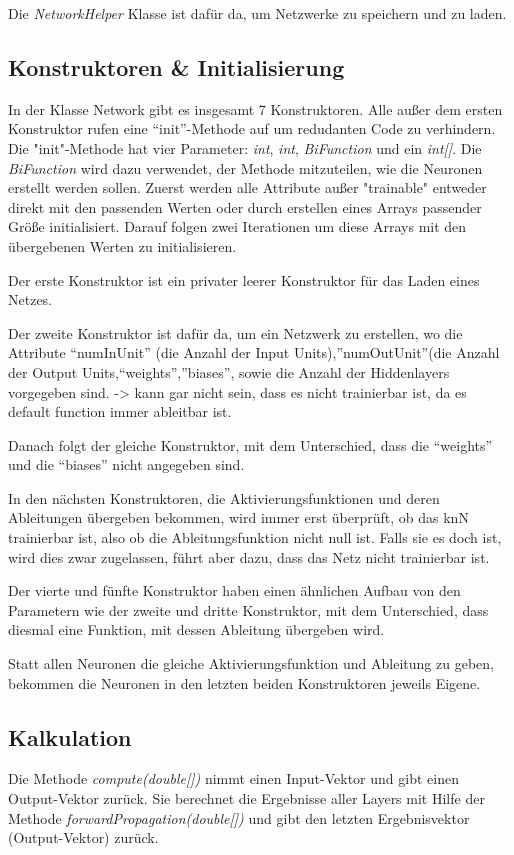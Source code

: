 \documentclass[paper=A4,pagesize=auto,12pt,headinclude=true,footinclude=true,BCOR=0mm,DIV=calc]{scrartcl}
\begin{document}
Die \textit{NetworkHelper} Klasse ist dafür da, um Netzwerke zu speichern und zu laden.


\subsection{Konstruktoren \& Initialisierung}
In der Klasse Network gibt es insgesamt 7 Konstruktoren.
Alle außer dem ersten Konstruktor rufen eine “init”-Methode auf um redudanten Code zu verhindern. Die "init"-Methode hat vier Parameter: \textit{int}, \textit{int}, \textit{BiFunction} und ein \textit{int[]}. Die \textit{BiFunction} wird dazu verwendet, der Methode mitzuteilen, wie die Neuronen erstellt werden sollen.
Zuerst werden alle Attribute außer "trainable" entweder direkt mit den passenden Werten oder durch erstellen eines Arrays passender Größe initialisiert.
Darauf folgen zwei Iterationen um diese Arrays mit den übergebenen Werten zu initialisieren.

Der erste Konstruktor ist ein privater leerer Konstruktor für das Laden eines Netzes. 

Der zweite Konstruktor ist dafür da, um ein Netzwerk zu erstellen, wo die Attribute “numInUnit” (die Anzahl der Input Units),”numOutUnit”(die Anzahl der Output Units,“weights”,”biases”, sowie die Anzahl der Hiddenlayers vorgegeben sind.
-> kann gar nicht sein, dass es nicht trainierbar ist, da es default function immer ableitbar ist.

Danach folgt der gleiche Konstruktor, mit dem Unterschied, dass die “weights” und die “biases” nicht angegeben sind.

In den nächsten Konstruktoren, die Aktivierungsfunktionen und deren Ableitungen übergeben bekommen, wird immer erst überprüft, ob das knN trainierbar ist, also ob die Ableitungsfunktion nicht null ist. Falls sie es doch ist, wird dies zwar zugelassen, führt aber dazu, dass das Netz nicht trainierbar ist. 

Der vierte und fünfte Konstruktor haben einen ähnlichen Aufbau von den Parametern wie der zweite und dritte Konstruktor, mit dem Unterschied, dass diesmal eine Funktion, mit dessen Ableitung übergeben wird.

Statt allen Neuronen die gleiche Aktivierungsfunktion und Ableitung zu geben, bekommen die Neuronen in den letzten beiden Konstruktoren jeweils Eigene.


\subsection{Kalkulation}
Die Methode \textit{compute(double[])} nimmt einen Input-Vektor und gibt einen Output-Vektor zurück. Sie berechnet die Ergebnisse aller Layers mit Hilfe der Methode \textit{forwardPropagation(double[])} und gibt den letzten Ergebnisvektor (Output-Vektor) zurück.
\end{document}
